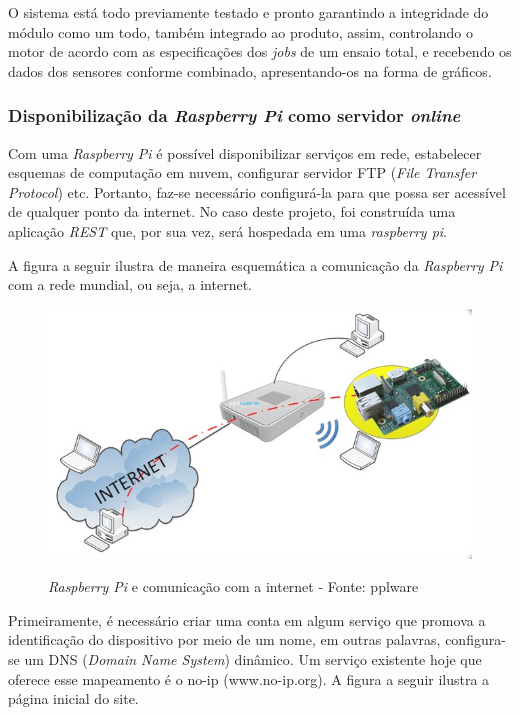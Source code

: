 O sistema está todo previamente testado e pronto garantindo a integridade do módulo como um todo, também integrado ao produto, assim, controlando o motor de acordo com as especificações dos \textit{jobs} de um ensaio total, e recebendo os dados dos sensores conforme combinado, apresentando-os na forma de gráficos.

\subsubsection{Disponibilização da \textit{Raspberry Pi} como servidor \textit{online}} \label{rasp_server}

Com uma \textit{Raspberry Pi} é possível disponibilizar serviços em rede, estabelecer esquemas de computação em nuvem, configurar servidor FTP (\textit{File Transfer Protocol}) etc. Portanto, faz-se necessário configurá-la para que possa ser acessível de qualquer ponto da internet. No caso deste projeto, foi construída uma aplicação \textit{REST} que, por sua vez, será hospedada em uma \textit{raspberry pi}.

A figura a seguir ilustra de maneira esquemática a comunicação da \textit{Raspberry Pi} com a rede mundial, ou seja, a internet.

\begin{figure}[H]
\centering
\includegraphics[keepaspectratio=true,scale=0.52]{figuras/raspberryeinternet.png}
\label{fig:raspberry_internet}
\caption{\textit{Raspberry Pi} e comunicação com a internet - Fonte: pplware}
\end{figure}

Primeiramente, é necessário criar uma conta em algum serviço que promova a identificação do dispositivo por meio de um nome, em outras palavras, configura-se um DNS (\textit{Domain Name System}) dinâmico. Um serviço existente hoje que oferece esse mapeamento é o no-ip (www.no-ip.org). A figura a seguir ilustra a página inicial do site.

